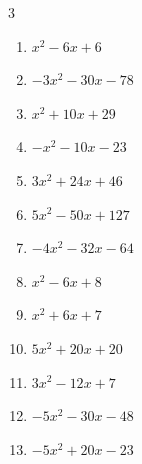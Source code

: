\begin{multicols}{3}
\begin{enumerate}
  \item $x^{2}-6x+6$


  \item $-3x^{2}-30x-78$


  \item $x^{2}+10x+29$


\columnbreak %

  \item $-x^{2}-10x-23$


  \item $3x^{2}+24x+46$


  \item $5x^{2}-50x+127$


  \item $-4x^{2}-32x-64$


  \item $x^{2}-6x+8$


  \item $x^{2}+6x+7$


  \item $5x^{2}+20x+20$


  \item $3x^{2}-12x+7$


  \item $-5x^{2}-30x-48$


  \item $-5x^{2}+20x-23$


\columnbreak %


\end{enumerate}
\end{multicols}
